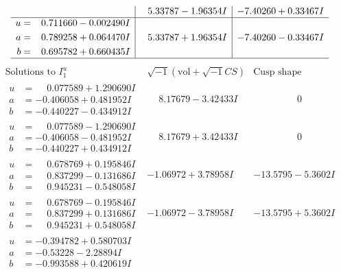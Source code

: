 \documentclass[1p]{elsarticle_modified}
\theoremstyle{definition}
\newcommand{\I}{\sqrt{-1}}
\begin{document}
$$\begin{array}{c|c|c}
 & \phantom{-}5.33787 - 1.96354 I & -7.40260 + 0.33467 I \\ \hline\begin{aligned}
u &= \phantom{-}0.711660 - 0.002490 I \\
a &= \phantom{-}0.789258 + 0.064470 I \\
b &= \phantom{-}0.695782 + 0.660435 I\end{aligned}
 & \phantom{-}5.33787 + 1.96354 I & -7.40260 - 0.33467 I\\
 \hline 
 \end{array}$$\newpage$$\begin{array}{c|c|c}  
\text{Solutions to }I^u_{1}& \I (\text{vol} + \sqrt{-1}CS) & \text{Cusp shape}\\
 \hline 
\begin{aligned}
u &= \phantom{-}0.077589 + 1.290690 I \\
a &= -0.406058 + 0.481952 I \\
b &= -0.440227 - 0.434912 I\end{aligned}
 & \phantom{-}8.17679 - 3.42433 I & \phantom{-0.000000 } 0 \\ \hline\begin{aligned}
u &= \phantom{-}0.077589 - 1.290690 I \\
a &= -0.406058 - 0.481952 I \\
b &= -0.440227 + 0.434912 I\end{aligned}
 & \phantom{-}8.17679 + 3.42433 I & \phantom{-0.000000 } 0 \\ \hline\begin{aligned}
u &= \phantom{-}0.678769 + 0.195846 I \\
a &= \phantom{-}0.837299 - 0.131686 I \\
b &= \phantom{-}0.945231 - 0.548058 I\end{aligned}
 & -1.06972 + 3.78958 I & -13.5795 - 5.3602 I \\ \hline\begin{aligned}
u &= \phantom{-}0.678769 - 0.195846 I \\
a &= \phantom{-}0.837299 + 0.131686 I \\
b &= \phantom{-}0.945231 + 0.548058 I\end{aligned}
 & -1.06972 - 3.78958 I & -13.5795 + 5.3602 I \\ \hline\begin{aligned}
u &= -0.394782 + 0.580703 I \\
a &= -0.53228 - 2.28894 I \\
b &= -0.993588 + 0.420619 I\end{aligned}

\end{array}$$
\end{document}

